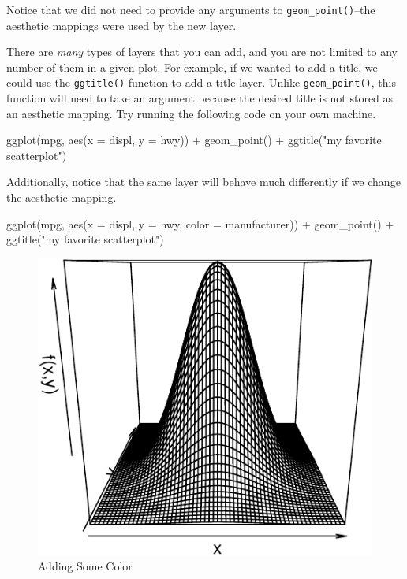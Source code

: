 \documentclass[
  12pt,
  krantz2]{krantz}
\makeatletter
\newenvironment{Shaded}{\begin{snugshade}}{\end{snugshade}}
\newcommand{\AttributeTok}[1]{\textcolor[rgb]{0.61,0.61,0.61}{#1}}
\newcommand{\FunctionTok}[1]{\textcolor[rgb]{0,0,0}{#1}}
\newcommand{\NormalTok}[1]{#1}
\newcommand{\SpecialCharTok}[1]{\textcolor[rgb]{0,0,0}{#1}}
\newcommand{\StringTok}[1]{\textcolor[rgb]{0.5,0.5,0.5}{#1}}
\newenvironment{kframe}{%
\medskip{}
\setlength{\fboxsep}{.8em}
 \def\at@end@of@kframe{}%
 \ifinner\ifhmode%
  \def\at@end@of@kframe{\end{minipage}}%
  \begin{minipage}{\columnwidth}%
 \fi\fi%
 \def\FrameCommand##1{\hskip\@totalleftmargin \hskip-\fboxsep
 \colorbox{shadecolor}{##1}\hskip-\fboxsep
     \hskip-\linewidth \hskip-\@totalleftmargin \hskip\columnwidth}%
 \MakeFramed {\advance\hsize-\width
   \@totalleftmargin\z@ \linewidth\hsize
   \@setminipage}}%
 {\par\unskip\endMakeFramed%
 \at@end@of@kframe}
\renewenvironment{Shaded}{\begin{kframe}}{\end{kframe}}
\makeatother
\begin{document}
Notice that we did not need to provide any arguments to \texttt{geom\_point()}--the aesthetic mappings were used by the new layer.

There are \emph{many} types of layers that you can add, and you are not limited to any number of them in a given plot. For example, if we wanted to add a title, we could use the \texttt{ggtitle()} function to add a title layer. Unlike \texttt{geom\_point()}, this function will need to take an argument because the desired title is not stored as an aesthetic mapping. Try running the following code on your own machine.

\begin{Shaded}
\begin{Highlighting}[]
\FunctionTok{ggplot}\NormalTok{(mpg, }\FunctionTok{aes}\NormalTok{(}\AttributeTok{x =}\NormalTok{ displ, }\AttributeTok{y =}\NormalTok{ hwy))  }\SpecialCharTok{+}
  \FunctionTok{geom\_point}\NormalTok{() }\SpecialCharTok{+} 
  \FunctionTok{ggtitle}\NormalTok{(}\StringTok{"my favorite scatterplot"}\NormalTok{)}
\end{Highlighting}
\end{Shaded}

Additionally, notice that the same layer will behave much differently if we change the aesthetic mapping.

\begin{Shaded}
\begin{Highlighting}[]
\FunctionTok{ggplot}\NormalTok{(mpg, }\FunctionTok{aes}\NormalTok{(}\AttributeTok{x =}\NormalTok{ displ, }\AttributeTok{y =}\NormalTok{ hwy, }\AttributeTok{color =}\NormalTok{ manufacturer))  }\SpecialCharTok{+}
  \FunctionTok{geom\_point}\NormalTok{() }\SpecialCharTok{+} 
  \FunctionTok{ggtitle}\NormalTok{(}\StringTok{"my favorite scatterplot"}\NormalTok{)}
\end{Highlighting}
\end{Shaded}

\begin{figure}
\centering
\includegraphics{r_and_python_book_files/figure-latex/unnamed-chunk-224-1.pdf}
\caption{\label{fig:unnamed-chunk-224}Adding Some Color}
\end{figure}
\end{document}
